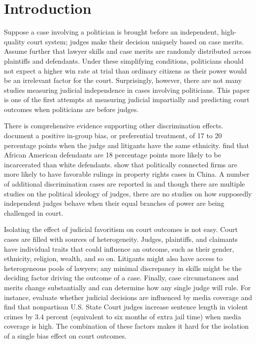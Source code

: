 \documentclass[11pt]{article}
\begin{document}
\clearpage

\section{Introduction} \label{sec:introduction_paper2}

Suppose a case involving a politician is brought before an independent, high-quality court system; judges make their decision uniquely based on case merits. Assume further that lawyer skills and case merits are randomly distributed across plaintiffs and defendants. Under these simplifying conditions, politicians should not expect a higher win rate at trial than ordinary citizens as their power would be an irrelevant factor for the court. Surprisingly, however, there are not many studies measuring judicial independence in cases involving politicians. This paper is one of the first attempts at measuring judicial impartially and predicting court outcomes when politicians are before judges.

There is comprehensive evidence supporting other discrimination effects. \citet{ShayoJudicialIngroupBias2011} document a positive in-group bias, or preferential treatment, of 17 to 20 percentage points when the judge and litigants have the same ethnicity. \citet{AbramsJudgesVaryTheir2012} find that African American defendants are 18 percentage points more likely to be incarcerated than white defendants. \citet{LuPoliticalConnectednessCourt2015} show that politically connected firms are more likely to have favorable rulings in property rights cases in China. A number of additional discrimination cases are reported in \citet{RachlinskiJudgingJudiciaryNumbers2017} and though there are multiple studies on the political ideology of judges, there are no studies on how supposedly independent judges behave when their equal branches of power are being challenged in court.

Isolating the effect of judicial favoritism on court outcomes is not easy. Court cases are filled with sources of heterogeneity. Judges, plaintiffs, and claimants have individual traits that could influence an outcome, such as their gender, ethnicity, religion, wealth, and so on. Litigants might also have access to heterogeneous pools of lawyers; any minimal discrepancy in skills might be the deciding factor driving the outcome of a case. Finally, case circumstances and merits change substantially and can determine how any single judge will rule. For instance, \citet{LimJudgePoliticianPress2015} evaluate whether judicial decisions are influenced by media coverage and find that nonpartisan U.S. State Court judges increase sentence length in violent crimes by 3.4 percent (equivalent to six months of extra jail time) when media coverage is high. The combination of these factors makes it hard for the isolation of a single bias effect on court outcomes.
\end{document}
